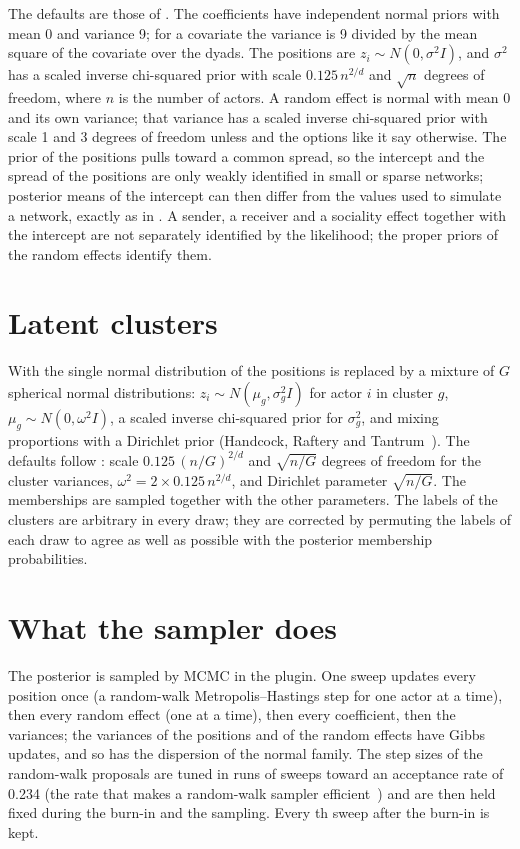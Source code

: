 The defaults are those of \latentnet{}. The coefficients have independent normal priors with mean 0 and variance 9; for a covariate the variance is 9 divided by the mean square of the covariate over the dyads. The positions are $z_i\sim N(0,\sigma^2I)$, and $\sigma^2$ has a scaled inverse chi-squared prior with scale $0.125\,n^{2/d}$ and $\sqrt n$ degrees of freedom, where $n$ is the number of actors. A random effect is normal with mean 0 and its own variance; that variance has a scaled inverse chi-squared prior with scale 1 and 3 degrees of freedom unless  and the options like it say otherwise. The prior of the positions pulls toward a common spread, so the intercept and the spread of the positions are only weakly identified in small or sparse networks; posterior means of the intercept can then differ from the values used to simulate a network, exactly as in \latentnet{}. A sender, a receiver and a sociality effect together with the intercept are not separately identified by the likelihood; the proper priors of the random effects identify them.

\section{Latent clusters}

With  the single normal distribution of the positions is replaced by a mixture of $G$ spherical normal distributions: $z_i\sim N(\mu_g,\sigma_g^2I)$ for actor $i$ in cluster $g$, $\mu_g\sim N(0,\omega^2I)$, a scaled inverse chi-squared prior for $\sigma_g^2$, and mixing proportions with a Dirichlet prior (Handcock, Raftery and Tantrum~\cite{handcock2007}). The defaults follow \latentnet{}: scale $0.125\,(n/G)^{2/d}$ and $\sqrt{n/G}$ degrees of freedom for the cluster variances, $\omega^2=2\times 0.125\,n^{2/d}$, and Dirichlet parameter $\sqrt{n/G}$. The memberships are sampled together with the other parameters. The labels of the clusters are arbitrary in every draw; they are corrected by permuting the labels of each draw to agree as well as possible with the posterior membership probabilities.

\section{What the sampler does}\label{sec:sampler}

The posterior is sampled by MCMC in the plugin. One sweep updates every position once (a random-walk Metropolis--Hastings step for one actor at a time), then every random effect (one at a time), then every coefficient, then the variances; the variances of the positions and of the random effects have Gibbs updates, and so has the dispersion of the normal family. The step sizes of the random-walk proposals are tuned in  runs of  sweeps toward an acceptance rate of 0.234 (the rate that makes a random-walk sampler efficient~\cite{roberts1997}) and are then held fixed during the burn-in and the sampling. Every th sweep after the burn-in is kept.

